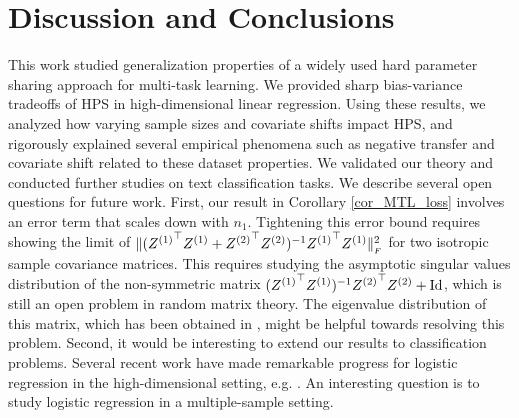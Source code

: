 \section{Discussion and Conclusions}\label{sec_conclude}

This work studied generalization properties of a widely used hard parameter sharing approach for multi-task learning.
We provided sharp bias-variance tradeoffs of HPS in high-dimensional linear regression.
Using these results, we analyzed how varying sample sizes and covariate shifts impact HPS, and rigorously explained several empirical phenomena such as negative transfer and covariate shift related to these dataset properties.
We validated our theory and conducted further studies on text classification tasks.
We describe several open questions for future work.
First, our result in Corollary \ref{cor_MTL_loss} involves an error term that scales down with $n_1$.
Tightening this error bound requires showing the limit of $\|({Z^{(1)}}^{\top} Z^{(1)} + {Z^{(2)}}^{\top} Z^{(2)})^{-1} {Z^{(1)}}^{\top} Z^{(1)}\|_{_{F}}^2$ for two isotropic sample covariance matrices.
This requires studying the asymptotic singular values distribution of the non-symmetric matrix $({Z^{(1)}}^{\top} Z^{(1)})^{-1}{Z^{(2)}}^{\top} Z^{(2)}+\operatorname{Id}$, which is still an open problem in random matrix theory.
The eigenvalue distribution of this matrix, which has been obtained in \cite{Fmatrix}, might be helpful towards resolving this problem.
Second, it would be interesting to extend our results to classification problems.
Several recent work have made remarkable progress for logistic regression in the high-dimensional setting, e.g. \cite{sur2019modern}.
An interesting question is to study logistic regression in a multiple-sample setting.


